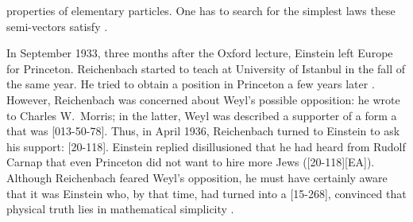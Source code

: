 \documentclass[draft]{article}
\begin{document}
properties of elementary particles. One has to search for the simplest laws these semi-vectors satisfy \citep[168]{Einstein1933}.

In September 1933, three months after the Oxford lecture, Einstein left Europe for Princeton. Reichenbach started to teach at University of Istanbul in the fall of the same year. He tried to obtain a position in Princeton a few years later \citep{Verhaegh2020a}. However, Reichenbach was concerned about Weyl's possible opposition:  he wrote to Charles W.\ Morris; in the latter, Weyl was described a supporter of a form a  that was  [013-50-78].  Thus, in April 1936, Reichenbach turned to Einstein to ask his support:  [20-118]. Einstein replied disillusioned that he had heard from Rudolf Carnap that even Princeton did not want to hire more Jews ([20-118][EA]). Although Reichenbach feared Weyl's opposition, he must have certainly aware that it was Einstein who, by that time, had turned into a  [15-268], convinced that physical truth lies in mathematical simplicity \citep{Ryckman2014}.  





\end{document}
